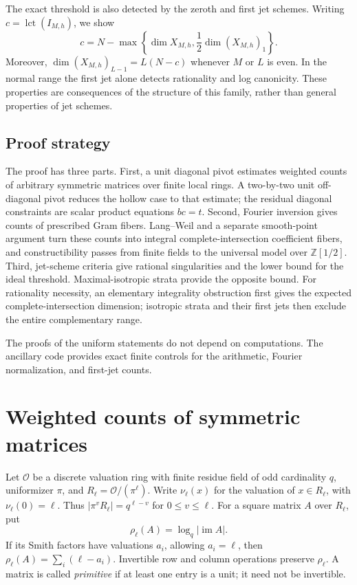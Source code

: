 \documentclass[11pt]{article}
\numberwithin{equation}{section}
\theoremstyle{remark}
\newcommand{\Z}{\mathbb Z}
\newcommand{\lct}{\operatorname{lct}}
\begin{document}
The exact threshold is also detected by the zeroth and first jet schemes.
Writing $c=\lct(I_{M,h})$, we show
\[
 c=N-\max\left\{\dim X_{M,h},\frac12\dim(X_{M,h})_1\right\}.
\]
Moreover, $\dim(X_{M,h})_{L-1}=L(N-c)$ whenever $M$ or $L$ is even.
In the normal range the first jet alone detects rationality and log
canonicity. These properties are consequences of the structure of this
family, rather than general properties of jet schemes.

\subsection{Proof strategy}
The proof has three parts. First, a unit diagonal pivot estimates
weighted counts of arbitrary symmetric matrices over finite local
rings. A two-by-two unit off-diagonal pivot reduces the hollow case to
that estimate; the residual diagonal constraints are scalar product
equations $bc=t$. Second, Fourier inversion gives counts of prescribed
Gram fibers. Lang--Weil and a separate smooth-point argument turn these
counts into integral complete-intersection coefficient fibers, and
constructibility passes from finite fields to the universal model over
$\Z[1/2]$. Third, jet-scheme criteria give rational singularities and the
lower bound for the ideal threshold. Maximal-isotropic strata provide
the opposite bound. For rationality necessity, an elementary
integrality obstruction first gives the expected complete-intersection
dimension; isotropic strata and their first jets then exclude the
entire complementary range.

The proofs of the uniform statements do not depend on computations.
The ancillary code provides exact finite controls for the arithmetic,
Fourier normalization, and first-jet counts.

\section{Weighted counts of symmetric matrices}
Let $\mathcal O$ be a discrete valuation ring with finite residue
field of odd cardinality $q$, uniformizer $\pi$, and
$R_\ell=\mathcal O/(\pi^\ell)$. Write $\nu_\ell(x)$ for the valuation
of $x\in R_\ell$, with $\nu_\ell(0)=\ell$. Thus
$|\pi^vR_\ell|=q^{\ell-v}$ for $0\le v\le\ell$.
For a square matrix $A$ over $R_\ell$, put
\[
 \rho_\ell(A)=\log_q|\operatorname{im} A|.
\]
If its Smith factors have valuations $a_i$, allowing $a_i=\ell$,
then $\rho_\ell(A)=\sum_i(\ell-a_i)$. Invertible row and column
operations preserve $\rho_\ell$. A matrix is called \emph{primitive}
if at least one entry is a unit; it need not be invertible.
\end{document}

